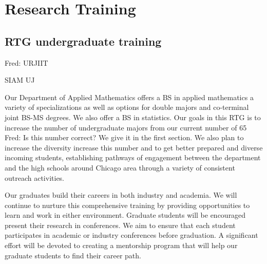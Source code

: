 \documentclass[11pt]{NSFamsart}
\newcommand{\FredNote}[1]{{\color{blue} Fred: #1}}
\begin{document}
\smallskip


\iffalse 

\noindent \textbf{Regular group activities:} We will hold   the weekly Quantum Dynamics Seminar.      Trainees in this team will present articles relevant for the main topics of the
project followed by a discussion of    next steps in   individual research issues.


 

\noindent \textbf{Yearly workshop:} A two-day workshop will be organized in the end of each academic year.  It will consist   of presentations by graduate
students and postdocs, with several invited lectures 
by top researchers.  
\fi



\section{Research Training }

\subsection{RTG undergraduate training }

\phantom{a}
\FredNote{
URJIIT

SIAM UJ}
 
Our Department of Applied Mathematics offers a BS in applied mathematics a variety of specializations as well as options for double majors and co-terminal joint BS-MS degrees. We also offer a BS in statistics.  Our goals in this RTG is to increase the number of undergraduate majors from our current number of 65 \FredNote{Is this number correct?  We give it in the first section}. We also plan to increase the diversity  increase this number and to get better prepared and diverse incoming students, establishing pathways of engagement between the department and the high schools around Chicago area through a variety of consistent outreach activities.



Our graduates build their careers in both industry and academia. We will continue to nurture this comprehensive training by providing opportunities to learn and work in either environment. Graduate students will be encouraged present their research in conferences. We aim to ensure that each student participates in academic or industry conferences before graduation. A significant effort 
will be devoted to creating a mentorship program that will help our graduate students to find their career path.
\end{document}
